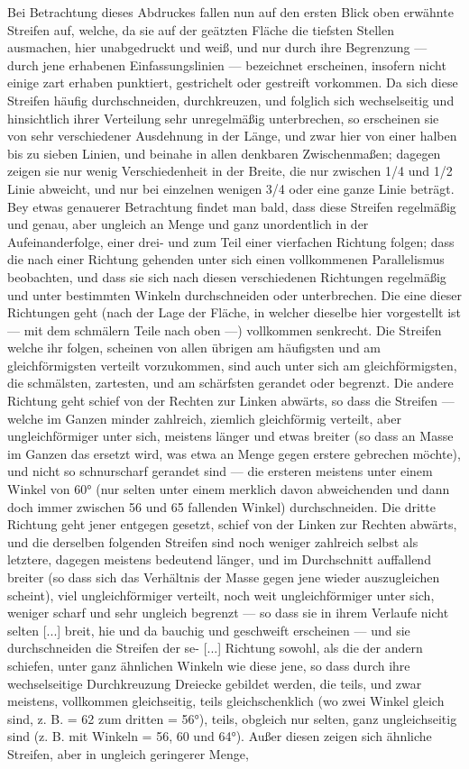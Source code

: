 \documentclass[a4paper, 11pt, oneside, german]{article}
\begin{document}
Bei Betrachtung dieses Abdruckes fallen nun auf den ersten Blick oben erwähnte Streifen auf, welche, da sie auf der geätzten Fläche die tiefsten Stellen ausmachen, hier unabgedruckt und weiß, und nur durch ihre Begrenzung --- durch jene erhabenen Einfassungslinien --- bezeichnet erscheinen, insofern nicht einige zart erhaben punktiert, gestrichelt oder gestreift vorkommen. Da sich diese Streifen häufig durchschneiden, durchkreuzen, und folglich sich wechselseitig und hinsichtlich ihrer Verteilung sehr unregelmäßig unterbrechen, so erscheinen sie von sehr verschiedener Ausdehnung in der Länge, und zwar hier von einer halben bis zu sieben Linien, und beinahe in allen denkbaren Zwischenmaßen; dagegen zeigen sie nur wenig Verschiedenheit in der Breite, die nur zwischen 1/4 und 1/2 Linie abweicht, und nur bei einzelnen wenigen 3/4 oder eine ganze Linie beträgt. Bey etwas genauerer Betrachtung findet man bald, dass diese Streifen regelmäßig und genau, aber ungleich an Menge und ganz unordentlich in der Aufeinanderfolge, einer drei- und zum Teil einer vierfachen Richtung folgen; dass die nach einer Richtung gehenden unter sich einen vollkommenen Parallelismus beobachten, und dass sie sich nach diesen verschiedenen Richtungen regelmäßig und unter bestimmten Winkeln durchschneiden oder unterbrechen. Die eine dieser Richtungen geht (nach der Lage der Fläche, in welcher dieselbe hier vorgestellt ist --- mit dem schmälern Teile nach oben ---) vollkommen senkrecht. Die Streifen welche ihr folgen, scheinen von allen übrigen am häufigsten und am gleichförmigsten verteilt vorzukommen, sind auch unter sich am gleichförmigsten, die schmälsten, zartesten, und am schärfsten gerandet oder begrenzt. Die andere Richtung geht schief von der Rechten zur Linken abwärts, so dass die Streifen --- welche im Ganzen minder zahlreich, ziemlich gleichförmig verteilt, aber ungleichförmiger unter sich, meistens länger und etwas breiter (so dass an Masse im Ganzen das ersetzt wird, was etwa an Menge gegen erstere gebrechen möchte), und nicht so schnurscharf gerandet sind --- die ersteren meistens unter einem Winkel von 60° (nur selten unter einem merklich davon abweichenden und dann doch immer zwischen 56 und 65 fallenden Winkel) durchschneiden. Die dritte Richtung geht jener entgegen gesetzt, schief von der Linken zur Rechten abwärts, und die derselben folgenden Streifen sind noch weniger zahlreich selbst als letztere, dagegen meistens bedeutend länger, und im Durchschnitt auffallend breiter (so dass sich das Verhältnis der Masse gegen jene wieder auszugleichen scheint), viel ungleichförmiger verteilt, noch weit ungleichförmiger unter sich, weniger scharf und sehr ungleich begrenzt --- so dass sie in ihrem Verlaufe nicht selten [...] breit, hie und da bauchig und geschweift erscheinen --- und sie durchschneiden die Streifen der se- [...] Richtung sowohl, als die der andern schiefen, unter ganz ähnlichen Winkeln wie diese jene, so dass durch ihre wechselseitige Durchkreuzung Dreiecke gebildet werden, die teils, und zwar meistens, vollkommen gleichseitig, teils gleichschenklich (wo zwei Winkel gleich sind, z. B. = 62 zum dritten = 56°), teils, obgleich nur selten, ganz ungleichseitig sind (z. B. mit Winkeln = 56, 60 und 64°). Außer diesen zeigen sich ähnliche Streifen, aber in ungleich geringerer Menge, 
\end{document}
